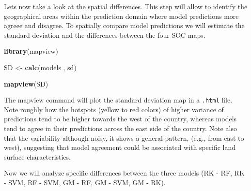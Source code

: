 \documentclass[10pt,b5paper,]{book}
\newenvironment{Shaded}{\begin{snugshade}}{\end{snugshade}}
\newcommand{\KeywordTok}[1]{\textcolor[rgb]{0.13,0.29,0.53}{\textbf{#1}}}
\newcommand{\NormalTok}[1]{#1}
\newcommand{\StringTok}[1]{\textcolor[rgb]{0.31,0.60,0.02}{#1}}
\theoremstyle{definition}
\theoremstyle{definition}
\theoremstyle{definition}
\theoremstyle{remark}
\begin{document}
Lets now take a look at the spatial differences. This step will allow to
identify the geographical areas within the prediction domain where model
predictions more agreee and disagree. To spatially compare model
predictions we will estimate the standard deviation and the differences
between the four SOC maps.

\begin{Shaded}
\begin{Highlighting}[]
\KeywordTok{library}\NormalTok{(mapview)}

\NormalTok{SD <-}\StringTok{ }\KeywordTok{calc}\NormalTok{(models , sd)}

\KeywordTok{mapview}\NormalTok{(SD)}
\end{Highlighting}
\end{Shaded}

The mapview command will plot the standard deviation map in a
\texttt{.html} file. Note roughly how the hotspots (yellow to red
colors) of higher variance of predictions tend to be higher towards the
west of the country, whereas models tend to agree in their predictions
across the east side of the country. Note also that the variability
although noisy, it shows a general pattern, (e.g., from east to west),
suggesting that model agreement could be associated with specific land
surface characteristics.

Now we will analyze specific differences between the three models (RK -
RF, RK - SVM, RF - SVM, GM - RF, GM - SVM, GM - RK).
\end{document}

